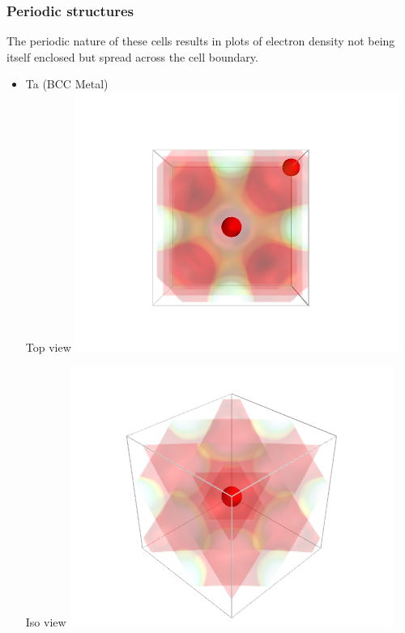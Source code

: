 \documentclass[11pt]{article}
\begin{document}
\subsubsection{Periodic structures}
\label{sec-1-6-2}


The periodic nature of these cells results in plots of electron density not being itself enclosed but spread across the cell boundary.
\begin{itemize}

\item Ta (BCC Metal)\\
\label{sec-1-6-2-1}%
Top view
\includegraphics[width=.9\linewidth]{./images/Ta_top.png}

Iso view
\includegraphics[width=.9\linewidth]{./images/Ta_iso.png}


\end{itemize}
\end{document}
